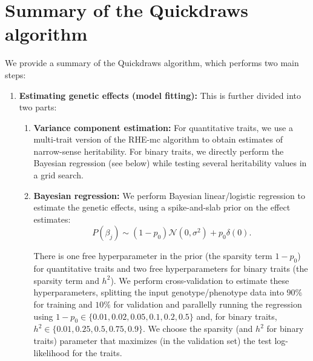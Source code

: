 \section{Summary of the Quickdraws algorithm}
\label{sec:ch4-summary}
%
We provide a summary of the Quickdraws algorithm, which performs two main steps:
%
\begin{enumerate}
    \item \textbf{Estimating genetic effects (model fitting):} This is further divided into two parts:
    \begin{enumerate}
        \item \textbf{Variance component estimation:}
        For quantitative traits, we use a multi-trait version of the RHE-mc algorithm \cite{wu2018scalable,pazokitoroudi2020efficient,zhu2024ARGRHE} to obtain estimates of narrow-sense heritability.
        For binary traits, we directly perform the Bayesian regression (see below) while testing several heritability values in a grid search.
        \item \textbf{Bayesian regression: }
        We perform Bayesian linear/logistic regression to estimate the genetic effects, using a spike-and-slab prior on the effect estimates:
        \begin{equation}
            P(\beta_j) \sim (1-p_0)\mathcal{N} (0, \sigma ^ 2) + p_0 \delta(0).
        \end{equation}
        
        There is one free hyperparameter in the prior (the sparsity term $1-p_0$) for quantitative traits and two free hyperparameters for binary traits (the sparsity term and $h^2$).
        We perform cross-validation to estimate these hyperparameters, splitting the input genotype/phenotype data into $90\%$ for training and $10\%$ for validation and parallelly running the regression using $1-p_0 \in \{0.01, 0.02, 0.05, 0.1, 0.2, 0.5\}$ and, for binary traits, $h^2 \in \{0.01, 0.25, 0.5, 0.75, 0.9 \}$.
        We choose the sparsity (and $h^2$ for binary traits) parameter that maximizes (in the validation set) the test log-likelihood for the traits.


\end{enumerate}
\end{enumerate}
